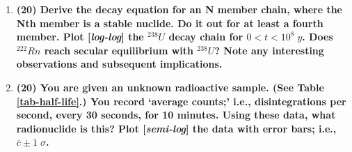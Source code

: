 \documentclass[11pt,a4paper]{article}
\begin{document}
\begin{enumerate}[leftmargin=*,topsep=0pt,font=\bfseries]
        
        
        
        
        
        
        
        
        
        
        \newpage
    \item\textbf{(20) Derive the decay equation for an N member chain, where the Nth member is a stable nuclide. Do it out for at least a fourth member. Plot [\textit{log-log}] the $^{238}U$ decay chain for $0<t<10^8\;y$. Does $^{222}Rn$ reach secular equilibrium with $^{238}U$? Note any interesting observations and subsequent implications.}
        \vspace{0.25in}\\
        
        
        
        
        
        
        
        
        
        
        
        
        
        
        
        \newpage
    \item\textbf{(20) You are given an unknown radioactive sample. (See Table \ref{tab-half-life}.) You record `average counts;' i.e., disintegrations per second, every 30 seconds, for 10 minutes. Using these data, what radionuclide is this? Plot [\textit{semi-log}] the data with error bars; i.e., $\overline{c} \pm 1 \; \sigma$.}
        \vspace{0.25in}\\















\end{enumerate}

\newpage
\end{document}
